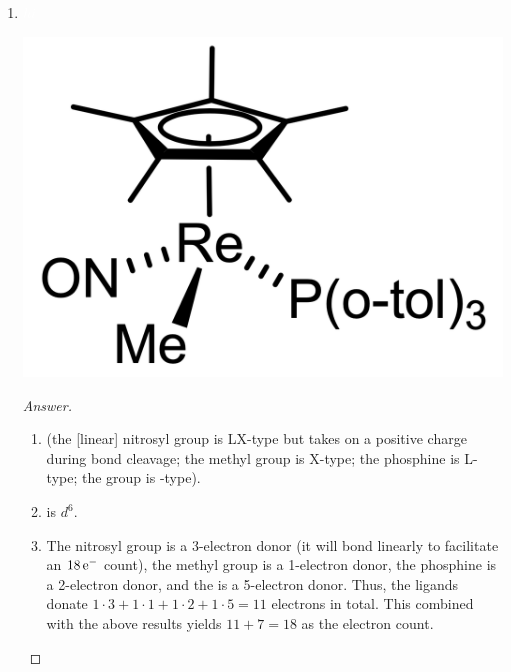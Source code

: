 \documentclass[../psets.tex]{subfiles}
\begin{document}
\begin{enumerate}
\begin{enumerate}[label={\arabic*)}]
        \begin{proof}[Answer]\leavevmode
            \begin{enumerate}[label={(\roman*)}]
                \item {} (both phenyl groups are X-type; both phosphines are L-type; both bridging hydroxides ($\mu$-OH) are LX-type).
                \item {} is $d^8$.
                \item Both phenyl groups are 1-electron donors, both phosphines are 2-electron donors, and both $\mu$-OH groups are 3-electron donors. Thus, the ligands donate $2\cdot 1+2\cdot 2+2\cdot 3=12$ electrons in total. This combined with the above results yields $\frac{12+2\cdot 10}{2}=16$ as the electron count at each palladium. Since this is a $16\,\e[-]$ square planar complex, there will be no  bonds even though the palladiums have the electrons to form them.
            \end{enumerate}
        \end{proof}
        \newpage
        \item ${\color{white}hi}$
        \vspace{-1em}
        \begin{center}
            \includegraphics[width=0.24\linewidth]{../ExtFiles/pset1-1-13.png}
        \end{center}
        \begin{proof}[Answer]\leavevmode
            \begin{enumerate}[label={(\roman*)}]
                \item {} (the [linear] nitrosyl group is LX-type but takes on a positive charge during bond cleavage; the methyl group is X-type; the phosphine is L-type; the  group is -type).
                \item {} is $d^6$.
                \item The nitrosyl group is a 3-electron donor (it will bond linearly to facilitate an $18\,\e[-]$ count), the methyl group is a 1-electron donor, the phosphine is a 2-electron donor, and the  is a 5-electron donor. Thus, the ligands donate $1\cdot 3+1\cdot 1+1\cdot 2+1\cdot 5=11$ electrons in total. This combined with the above results yields $11+7=18$ as the electron count.

\end{enumerate}
\end{proof}
\end{enumerate}
\end{enumerate}
\end{document}
